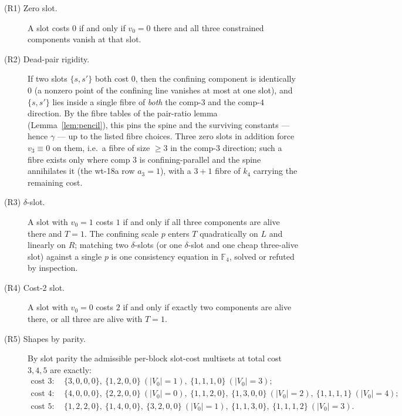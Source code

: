 \documentclass[11pt]{article}
\newcommand{\F}[1]{\mathbb{F}_{#1}}
\theoremstyle{plain}
\theoremstyle{definition}
\theoremstyle{remark}
\begin{document}
\begin{description}
\item[(R1) Zero slot.] A slot costs $0$ if and only if $v_0=0$ there and all three
  constrained components vanish at that slot.

\item[(R2) Dead-pair rigidity.] If two slots $\{s,s'\}$ both cost $0$, then the confining
  component is identically $0$ (a nonzero point of the confining line vanishes at most at one
  slot), and $\{s,s'\}$ lies inside a single fibre of \emph{both} the comp-$3$ and the
  comp-$4$ direction. By the fibre tables of the pair-ratio lemma (Lemma~\ref{lem:pencil}),
  this pins the spine and the surviving constants --- hence $\gamma$ --- up to the listed
  fibre choices. Three zero slots in addition force $v_3\equiv 0$ on them, i.e.\ a fibre of
  size $\ge 3$ in the comp-$3$ direction; such a fibre exists only where comp $3$ is
  confining-parallel and the spine annihilates it (the wt-18a row $a_3=1$), with a $3{+}1$
  fibre of $k_4$ carrying the remaining cost.

\item[(R3) $\delta$-slot.] A slot with $v_0=1$ costs $1$ if and only if all three components
  are alive there and $T=1$. The confining scale $p$ enters $T$ quadratically on $L$ and
  linearly on $R$; matching two $\delta$-slots (or one $\delta$-slot and one cheap
  three-alive slot) against a single $p$ is one consistency equation in $\F4$, solved or
  refuted by inspection.

\item[(R4) Cost-2 slot.] A slot with $v_0=0$ costs $2$ if and only if exactly two components
  are alive there, or all three are alive with $T=1$.

\item[(R5) Shapes by parity.] By slot parity the admissible per-block slot-cost multisets at
  total cost $3,4,5$ are exactly:
  \[
  \begin{aligned}
  \text{cost }3:\ & \{3,0,0,0\},\ \{1,2,0,0\}\ (|V_0|{=}1),\ \{1,1,1,0\}\ (|V_0|{=}3);\\
  \text{cost }4:\ & \{4,0,0,0\},\ \{2,2,0,0\}\ (|V_0|{=}0),\ \{1,1,2,0\},\ \{1,3,0,0\}\ (|V_0|{=}2),\ \{1,1,1,1\}\ (|V_0|{=}4);\\
  \text{cost }5:\ & \{1,2,2,0\},\ \{1,4,0,0\},\ \{3,2,0,0\}\ (|V_0|{=}1),\ \{1,1,3,0\},\ \{1,1,1,2\}\ (|V_0|{=}3).
  \end{aligned}
  \]
\end{description}
\end{document}
